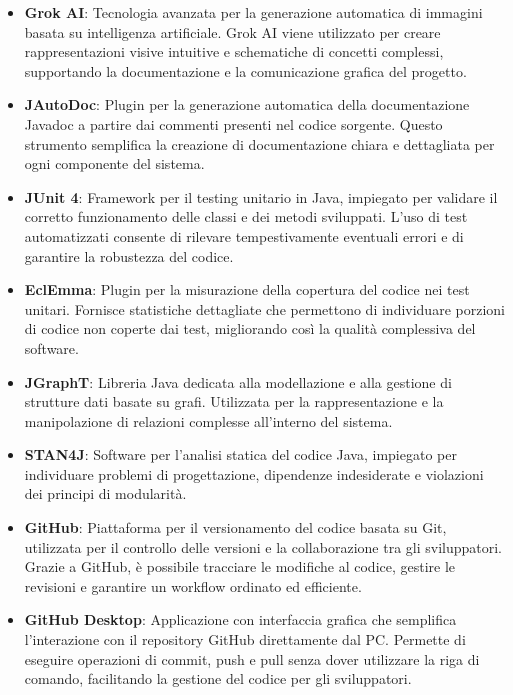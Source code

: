 \begin{itemize}
    \item \textbf{Grok AI}: Tecnologia avanzata per la generazione automatica di immagini basata su intelligenza artificiale. Grok AI viene utilizzato per creare rappresentazioni visive intuitive e schematiche di concetti complessi, supportando la documentazione e la comunicazione grafica del progetto.

    \item \textbf{JAutoDoc}: Plugin per la generazione automatica della documentazione Javadoc a partire dai commenti presenti nel codice sorgente. Questo strumento semplifica la creazione di documentazione chiara e dettagliata per ogni componente del sistema.

    \item \textbf{JUnit 4}: Framework per il testing unitario in Java, impiegato per validare il corretto funzionamento delle classi e dei metodi sviluppati. L’uso di test automatizzati consente di rilevare tempestivamente eventuali errori e di garantire la robustezza del codice.

    \item \textbf{EclEmma}: Plugin per la misurazione della copertura del codice nei test unitari. Fornisce statistiche dettagliate che permettono di individuare porzioni di codice non coperte dai test, migliorando così la qualità complessiva del software.

    \item \textbf{JGraphT}: Libreria Java dedicata alla modellazione e alla gestione di strutture dati basate su grafi. Utilizzata per la rappresentazione e la manipolazione di relazioni complesse all’interno del sistema.

    \item \textbf{STAN4J}: Software per l'analisi statica del codice Java, impiegato per individuare problemi di progettazione, dipendenze indesiderate e violazioni dei principi di modularità.

    \item \textbf{GitHub}: Piattaforma per il versionamento del codice basata su Git, utilizzata per il controllo delle versioni e la collaborazione tra gli sviluppatori. Grazie a GitHub, è possibile tracciare le modifiche al codice, gestire le revisioni e garantire un workflow ordinato ed efficiente. 

    \item \textbf{GitHub Desktop}: Applicazione con interfaccia grafica che semplifica l’interazione con il repository GitHub direttamente dal PC. Permette di eseguire operazioni di commit, push e pull senza dover utilizzare la riga di comando, facilitando la gestione del codice per gli sviluppatori.


\end{itemize}
